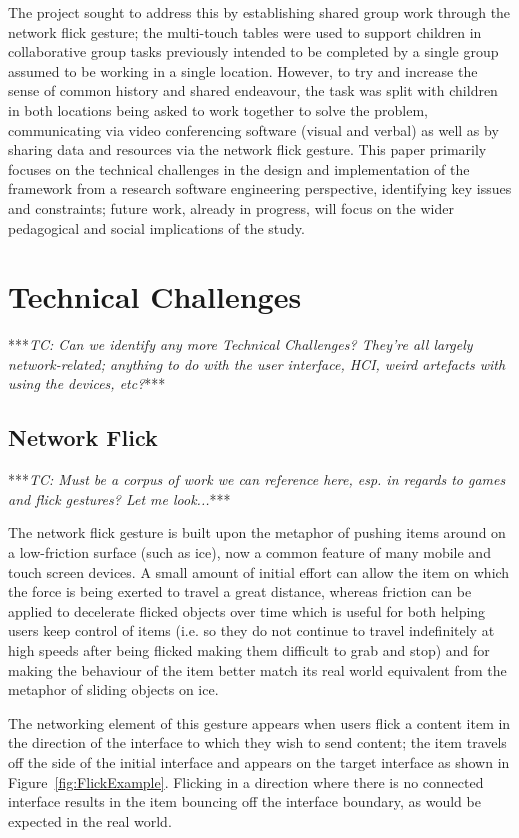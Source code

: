 \documentclass[a4paper,11pt]{article}
\begin{document}
The project sought to address this by establishing shared group work through the network flick gesture; the multi-touch tables were used to support children in collaborative group tasks previously intended to be completed by a single group assumed to be working in a single location.
However, to try and increase the sense of common history and shared endeavour, the task was split with children in both locations being asked to work together to solve the problem, communicating via video conferencing software (visual and verbal) as well as by sharing data and resources via the network flick gesture.
This paper primarily focuses on the technical challenges in the design and implementation of the framework from a research software engineering perspective, identifying key issues and constraints; future work, already in progress, will focus on the wider pedagogical and social implications of the study.


\section{Technical Challenges}

***{\emph{TC: Can we identify any more Technical Challenges? They're all largely network-related; anything to do with the user interface, HCI, weird artefacts with using the devices, etc?}}***

\subsection{Network Flick}

***{\emph{TC: Must be a corpus of work we can reference here, esp. in regards to games and flick gestures? Let me look...}}***

The network flick gesture is built upon the metaphor of pushing items around on a low-friction surface (such as ice), now a common feature of many mobile and touch screen devices.
A small amount of initial effort can allow the item on which the force is being exerted to travel a great distance, whereas friction can be applied to decelerate flicked objects over time which is useful for both helping users keep control of items (i.e. so they do not continue to travel indefinitely at high speeds after being flicked making them difficult to grab and stop) and for making the behaviour of the item better match its real world equivalent from the metaphor of sliding objects on ice.

The networking element of this gesture appears when users flick a content item in the direction of the interface to which they wish to send content; the item travels off the side of the initial interface and appears on the target interface as shown in Figure~\ref{fig:FlickExample}.
Flicking in a direction where there is no connected interface results in the item bouncing off the interface boundary, as would be expected in the real world.
\end{document}
